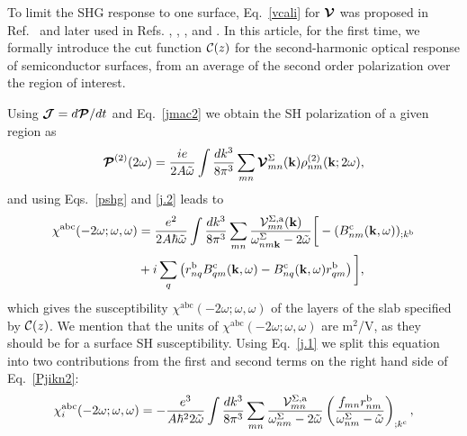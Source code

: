 \documentclass[floatfix,prb,aps,superscriptaddress,showpacs,11pt,preprint,letterpaper]{revtex4}
\begin{document}
To limit the SHG response to one surface, Eq.~\eqref{vcali} 
for $\boldsymbol{\mathcal{\cal V}}$ was proposed in 
Ref.~ and later used in Refs.
,
,
,
 and . 
In this article, for the first time, we formally introduce the cut function ${\mathbf{\cal C}}(z)$ 
for the second-harmonic optical response of semiconductor surfaces,
from an average of the second order polarization over the region of interest.

Using
$\boldsymbol{\mathcal{\cal J}}=d\boldsymbol{\mathcal{\cal P}}/dt$ 
and Eq.~\eqref{jmac2} 
we obtain the SH polarization of a given region as
\begin{equation}
\boldsymbol{\mathcal{\cal P}}^{(2)}(2\omega)
=\frac{ie}{2A\tilde\omega}
\int \frac{dk^3}{8\pi^3}
\sum_{mn}
\boldsymbol{\mathcal{\cal V}}^{\Sigma}_{mn}(\mathbf{k})
\rho^{(2)}_{nm}(\mathbf{k};2\omega)
,
\label{Pjikn}
\end{equation}
and using Eqs.~\eqref{pshg} and \eqref{j.2} 
leads to
\begin{align}
\chi^{\mathrm{a}\mathrm{b}\mathrm{c}}(-2\omega;\omega,\omega) 
&=
\frac{e^2}{2A\hbar\tilde\omega}
\int \frac{dk^3}{8\pi^3}
\sum_{mn}
\frac{{\mathbf{\cal V}}^{\Sigma,\mathrm{a}}_{mn}(\mathbf{k})}
{\omega^\Sigma_{nm\mathbf{k}}-2\tilde\omega}
\bigg[
-(B_{nm}^{\mathrm{c}}(\mathbf{k},\omega))_{;k^{\mathrm{b}}}
\nonumber \\
&
+i\sum_q\left(r_{nq}^{\mathrm{b}}B_{qm}^{\mathrm{c}}(\mathbf{k},\omega) -
  B_{nq}^{\mathrm{c}}(\mathbf{k},\omega) 
  r_{qm}^{\mathrm{b}}\right)
\bigg]
,
\label{Pjikn2}
\end{align}
which gives the susceptibility 
$\chi^{\mathrm{a}\mathrm{b}\mathrm{c}}(-2\omega;\omega,\omega)$ 
of the layers of the slab specified by ${\mathbf{\cal C}}(z)$. 
We mention that the units of 
$\chi^{\mathrm{a}\mathrm{b}\mathrm{c}}(-2\omega;\omega,\omega)$
are m$^2$/V, as they should be for a surface SH susceptibility.
Using Eq.~\eqref{j.1} we
split this equation into
two contributions from the first and second terms on the right hand side
of Eq.~\eqref{Pjikn2}:
\begin{equation}
\chi^{\mathrm{a}\mathrm{b}\mathrm{c}}_i (-2\omega;\omega,\omega)
=-\frac{e^3}{A\hbar^22\tilde\omega}
\int \frac{dk^3}{8\pi^3}
\sum_{mn}
\frac{{\mathbf{\cal V}}_{mn}^{\Sigma,\mathrm{a}}}{\omega^\Sigma_{nm}-2\tilde\omega}
\left(\frac{f_{mn}r_{nm}^{\mathrm{b}}}{\omega^\Sigma_{nm}-\tilde\omega}\right)_{;k^{\mathrm{c}}}
,
\label{chii}
\end{equation} 
\end{document}
